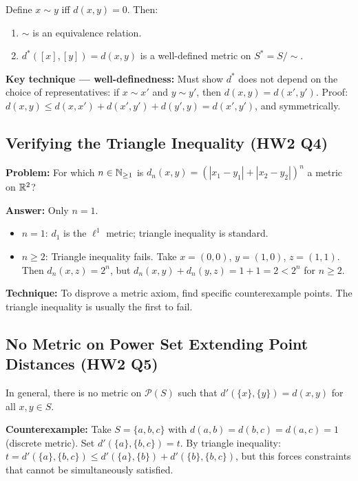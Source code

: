 \documentclass{article}
\begin{document}
\begin{proposition}
  Define $x \sim y$ iff $d(x,y) = 0$. Then:
  \begin{enumerate}
    \item $\sim$ is an equivalence relation.
    \item $d^*([x],[y]) = d(x,y)$ is a well-defined metric on $S^* = S/{\sim}$.
  \end{enumerate}
\end{proposition}
\textbf{Key technique --- well-definedness:} Must show $d^*$ does not
depend on the choice of representatives: if $x \sim x'$ and $y \sim y'$,
then $d(x,y) = d(x',y')$. Proof: $d(x,y) \le d(x,x') + d(x',y') +
d(y',y) = d(x',y')$, and symmetrically.

\subsection{Verifying the Triangle Inequality (HW2 Q4)}
\textbf{Problem:} For which $n \in \mathbb{N}_{\ge 1}$ is $d_n(x,y) =
(|x_1 - y_1| + |x_2 - y_2|)^n$ a metric on $\mathbb{R}^2$?

\textbf{Answer:} Only $n = 1$.
\begin{itemize}
  \item $n = 1$: $d_1$ is the $\ell^1$ metric; triangle inequality is standard.
  \item $n \ge 2$: Triangle inequality fails. Take $x = (0,0)$, $y =
    (1,0)$, $z = (1,1)$. Then $d_n(x,z) = 2^n$, but $d_n(x,y) + d_n(y,z)
    = 1 + 1 = 2 < 2^n$ for $n \ge 2$.
\end{itemize}
\textbf{Technique:} To disprove a metric axiom, find specific
counterexample points. The triangle inequality is usually the first to
fail.

\subsection{No Metric on Power Set Extending Point Distances (HW2 Q5)}
\begin{proposition}
  In general, there is no metric on $\mathcal{P}(S)$ such that
  $d'(\{x\},\{y\}) = d(x,y)$ for all $x, y \in S$.
\end{proposition}
\textbf{Counterexample:} Take $S = \{a, b, c\}$ with $d(a,b) = d(b,c)
= d(a,c) = 1$ (discrete metric). Set $d'(\{a\},\{b,c\}) = t$.
By triangle inequality: $t = d'(\{a\},\{b,c\}) \le d'(\{a\},\{b\}) +
d'(\{b\},\{b,c\})$, but this forces constraints that cannot be
simultaneously satisfied.
\end{document}
